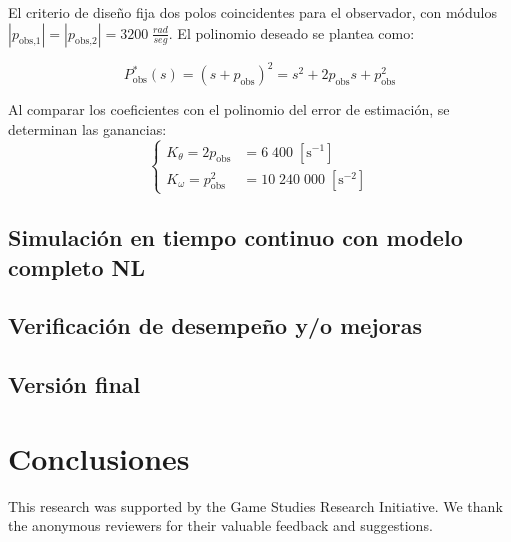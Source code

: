 \documentclass[blue,fullpaper]{ludusofficial}  %
\begin{document}
El criterio de diseño fija dos polos coincidentes para el observador, con módulos $|p_{\text{obs,1}}|=|p_{\text{obs,2}}|=3200\;\frac{rad}{seg}$. El polinomio deseado se plantea como:

\[
P^{*}_{\text{obs}}(s) = (s+p_{\text{obs}})^{2}=s^{2}+2p_{\text{obs}}s+p_{\text{obs}}^{2}
\]

Al comparar los coeficientes con el polinomio del error de estimación, se determinan las ganancias:
\[
\left\{
\begin{aligned}
K_{\theta}   = 2p_{\text{obs}} & = 6\; 400 \; [\text{s}^{-1}] \\
K_{\omega}  = p_{\text{obs}}^{2} & = 10\; 240\; 000 \; [\text{s}^{-2}]
\end{aligned}
\right.
\]


\subsection{ Simulación en tiempo continuo con modelo completo NL}


\subsection{Verificación de desempeño y/o mejoras}


\subsection{Versión final}


\newpage
\section{Conclusiones}


\begin{acknowledgments}
This research was supported by the Game Studies Research Initiative. We thank the anonymous reviewers for their valuable feedback and suggestions.
\end{acknowledgments}



\end{document}
